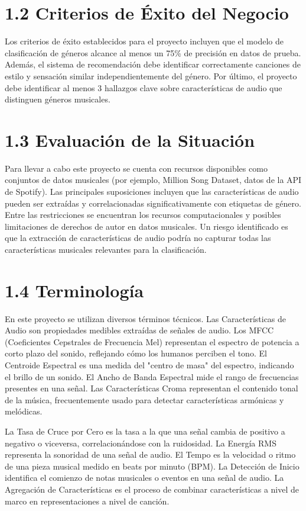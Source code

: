 \documentclass{article}
\begin{document}
\section*{1.2 Criterios de Éxito del Negocio}
Los criterios de éxito establecidos para el proyecto incluyen que el modelo de clasificación de géneros alcance al menos un 75\% de precisión en datos de prueba. Además, el sistema de recomendación debe identificar correctamente canciones de estilo y sensación similar independientemente del género. Por último, el proyecto debe identificar al menos 3 hallazgos clave sobre características de audio que distinguen géneros musicales.

\section*{1.3 Evaluación de la Situación}
Para llevar a cabo este proyecto se cuenta con recursos disponibles como conjuntos de datos musicales (por ejemplo, Million Song Dataset, datos de la API de Spotify). Las principales suposiciones incluyen que las características de audio pueden ser extraídas y correlacionadas significativamente con etiquetas de género. Entre las restricciones se encuentran los recursos computacionales y posibles limitaciones de derechos de autor en datos musicales. Un riesgo identificado es que la extracción de características de audio podría no capturar todas las características musicales relevantes para la clasificación.

\section*{1.4 Terminología}
En este proyecto se utilizan diversos términos técnicos. Las Características de Audio son propiedades medibles extraídas de señales de audio. Los MFCC (Coeficientes Cepstrales de Frecuencia Mel) representan el espectro de potencia a corto plazo del sonido, reflejando cómo los humanos perciben el tono. El Centroide Espectral es una medida del "centro de masa" del espectro, indicando el brillo de un sonido. El Ancho de Banda Espectral mide el rango de frecuencias presentes en una señal. Las Características Croma representan el contenido tonal de la música, frecuentemente usado para detectar características armónicas y melódicas.

La Tasa de Cruce por Cero es la tasa a la que una señal cambia de positivo a negativo o viceversa, correlacionándose con la ruidosidad. La Energía RMS representa la sonoridad de una señal de audio. El Tempo es la velocidad o ritmo de una pieza musical medido en beats por minuto (BPM). La Detección de Inicio identifica el comienzo de notas musicales o eventos en una señal de audio. La Agregación de Características es el proceso de combinar características a nivel de marco en representaciones a nivel de canción.
\end{document}
